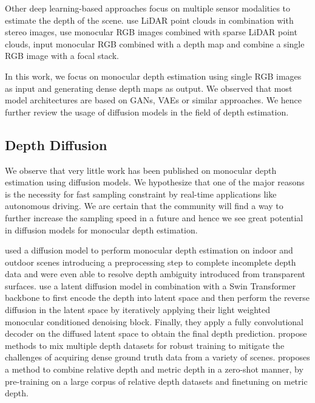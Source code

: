 Other deep learning-based approaches focus on multiple sensor modalities to estimate the depth of the scene. \cite{zhang_lidar-guided_2022} use LiDAR point clouds in combination with stereo images, \cite{eldesokey_confidence_2020} use monocular RGB images combined with sparse LiDAR point clouds, \cite{liu_pseudo-lidar_2020} input monocular RGB combined with a depth map and \cite{piao_dynamic_2021} combine a single RGB image with a focal stack.

In this work, we focus on monocular depth estimation using single RGB images as input and generating dense depth maps as output.
We observed that most model architectures are based on GANs, VAEs or similar approaches. We hence further review the usage of diffusion models in the field of depth estimation.

\subsection{Depth Diffusion}
We observe that very little work has been published on monocular depth estimation using diffusion models. We hypothesize that one of the major reasons is the necessity for fast sampling constraint by real-time applications like autonomous driving. We are certain that the community will find a way to further increase the sampling speed in a future and hence we see great potential in diffusion models for monocular depth estimation.

\cite{saxena_monocular_2023} used a diffusion model to perform monocular depth estimation on indoor and outdoor scenes introducing a preprocessing step to complete incomplete depth data and were even able to resolve depth ambiguity introduced from transparent surfaces.
\cite{duan_diffusiondepth_2023} use a latent diffusion model in combination with a Swin Transformer backbone \citep{liu_swin_2021} to first encode the depth into latent space and then perform the reverse diffusion in the latent space by iteratively applying their light weighted monocular conditioned denoising block. Finally, they apply a fully convolutional decoder on the diffused latent space to obtain the final depth prediction.
\cite{ranftl_towards_2020} propose methods to mix multiple depth datasets for robust training to mitigate the challenges of acquiring dense ground truth data from a variety of scenes. \cite{bhat_zoedepth_2023} proposes a method to combine relative depth and metric depth in a zero-shot manner, by pre-training on a large corpus of relative depth datasets and finetuning on metric depth.

